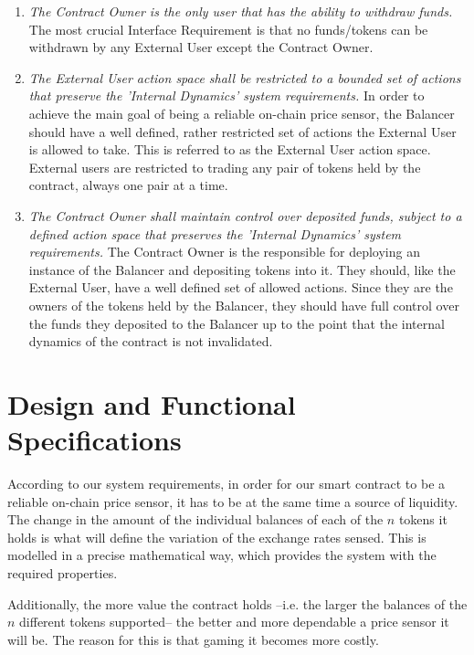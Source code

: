 \documentclass[11pt]{amsart}
\begin{document}
\begin{enumerate}    
    \item \textit{The Contract Owner is the only user that has the ability to withdraw funds.} The most crucial Interface Requirement is that no funds/tokens can be withdrawn by any External User except the Contract Owner.
    
    \item \textit{The External User action space shall be restricted to a bounded set of actions that preserve the 'Internal Dynamics' system requirements.} In order to achieve the main goal of being a reliable on-chain price sensor, the Balancer should have a well defined, rather restricted set of actions the External User is allowed to take. This is referred to as the External User action space. External users are restricted to trading any pair of tokens held by the contract, always one pair at a time.
    
    \item \textit{The Contract Owner shall maintain control over deposited funds, subject to a defined action space that preserves the 'Internal Dynamics' system requirements.} The Contract Owner is the responsible for deploying an instance of the Balancer and depositing tokens into it. They should, like the External User, have a well defined set of allowed actions. Since they are the owners of the tokens held by the Balancer, they should have full control over the funds they deposited to the Balancer up to the point that the internal dynamics of the contract is not invalidated.  
 
\end{enumerate}


\section{Design and Functional Specifications}

According to our system requirements, in order for our smart contract to be a reliable on-chain price sensor, it has to be at the same time a source of liquidity. The change in the amount of the individual balances of each of the $n$ tokens it holds is what will define the variation of the exchange rates sensed. This is modelled in a precise mathematical way, which provides the system with the required properties. 

Additionally, the more value the contract holds --i.e. the larger the balances of the $n$ different tokens supported--  the better and more dependable a price sensor it will be. The reason for this is that gaming it becomes more costly. 
\end{document}
